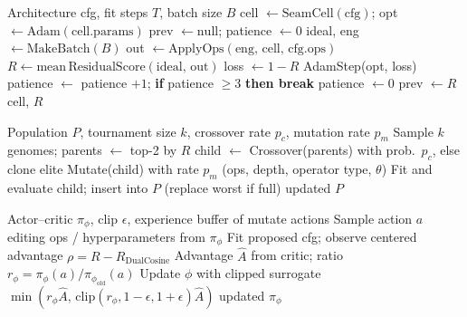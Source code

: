 \begin{algorithm}[t]
\caption{FitCell (inner loop)}
\label{alg:fit}
\begin{algorithmic}[1]
\Require Architecture cfg, fit steps $T$, batch size $B$
\State cell $\gets \mathrm{SeamCell}(\mathrm{cfg})$; opt $\gets \mathrm{Adam}(\mathrm{cell.params})$
\State prev $\gets \mathrm{null}$; patience $\gets 0$
  \State ideal, eng $\gets \mathrm{MakeBatch}(B)$
  \State out $\gets \mathrm{ApplyOps}(\mathrm{eng},\,\mathrm{cell},\,\mathrm{cfg.ops})$
  \State $R \gets \mathrm{mean}\,\mathrm{ResidualScore}(\mathrm{ideal},\,\mathrm{out})$
  \State loss $\gets 1-R$
   AdamStep(opt, loss)
  \EndIf
    \State patience $\gets$ patience $+1$; \textbf{if} patience $\ge 3$ \textbf{then break}
  \Else
    \State patience $\gets 0$
  \EndIf
  \State prev $\gets R$
\EndFor
\State \Return cell, $R$
\end{algorithmic}
\end{algorithm}

\begin{algorithm}[t]
\caption{GA tournament step}
\label{alg:ga}
\begin{algorithmic}[1]
\Require Population $P$, tournament size $k$, crossover rate $p_c$, mutation rate $p_m$
\State Sample $k$ genomes; parents $\gets$ top-2 by $R$
\State child $\gets$ Crossover(parents) with prob.\ $p_c$, else clone elite
\State Mutate(child) with rate $p_m$ (ops, depth, operator type, $\theta$)
\State Fit and evaluate child; insert into $P$ (replace worst if full)
\State \Return updated $P$
\end{algorithmic}
\end{algorithm}

\begin{algorithm}[t]
\caption{PPO architecture update}
\label{alg:ppo}
\begin{algorithmic}[1]
\Require Actor--critic $\pi_\phi$, clip $\epsilon$, experience buffer of mutate actions
\State Sample action $a$ editing ops / hyperparameters from $\pi_\phi$
\State Fit proposed cfg; observe centered advantage $\rho = R - R_{\mathrm{DualCosine}}$ 
\State Advantage $\hat{A}$ from critic; ratio $r_\phi = \pi_\phi(a)/\pi_{\phi_{\mathrm{old}}}(a)$
\State Update $\phi$ with clipped surrogate $\min(r_\phi\hat{A},\,\mathrm{clip}(r_\phi,1-\epsilon,1+\epsilon)\hat{A})$
\State \Return updated $\pi_\phi$
\end{algorithmic}
\end{algorithm}

